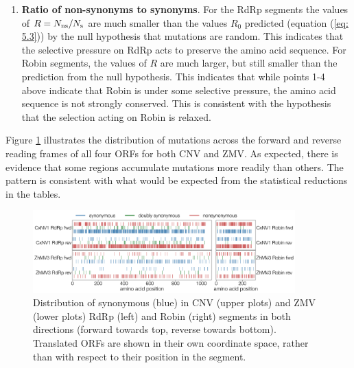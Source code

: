 \documentclass[unnumsec,webpdf,contemporary,large,namedate]{oup-authoring-template}%
\theoremstyle{thmstyleone}%
\theoremstyle{thmstyletwo}%
\theoremstyle{thmstylethree}%
\begin{document}
\begin{enumerate}
\item{\bf Ratio of non-synonyms to synonyms}. For the RdRp segments the values of
$R=N_{\rm ns}/N_{\rm s}$ are much smaller than the values $R_0$
predicted (equation (\ref{eq: 5.3})) by the null hypothesis that mutations are random. This indicates that the selective
pressure on RdRp acts to preserve the amino acid sequence. For Robin segments, the values of $R$
are much larger, but still smaller than the prediction from the null hypothesis. This indicates that while
points 1-4 above indicate that Robin is under some selective pressure, the amino acid sequence
is not strongly conserved.
This is consistent with the hypothesis that the selection acting on Robin is relaxed.

\end{enumerate}

Figure \ref{fig: 2} illustrates the distribution of mutations across the forward and reverse reading frames
of all four ORFs for both CNV and ZMV. As expected, there is evidence that some regions accumulate mutations more readily than others.
The pattern is consistent with what would be expected from the statistical reductions in the tables.

\begin{figure}
\begin{center}
\includegraphics[width=0.9\textwidth]{narna-diversity.png}
\caption{\label{fig: 2}
Distribution of synonymous (blue) in CNV (upper plots) and ZMV (lower plots) 
RdRp (left) and Robin (right) segments in both directions (forward towards top, reverse towards bottom).
Translated ORFs are shown in their own coordinate space, rather than with respect to their position in the segment.
}
\end{center}
\end{figure}
\end{document}
